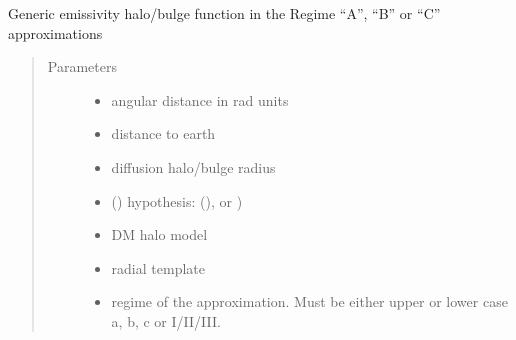 \documentclass[letterpaper,10pt,english]{sphinxmanual}
\begin{document}
\begin{fulllineitems}
\label{\detokenize{diffsph.profiles:diffsph.profiles.hfactors.H_brightness}}
\sphinxAtStartPar
Generic emissivity halo/bulge function in the Regime “A”, “B” or “C” approximations
\begin{quote}\begin{description}
\item[{Parameters}] \leavevmode\begin{itemize}
\item {} 
\sphinxAtStartPar
{} \textendash{} angular distance in rad units

\item {} 
\sphinxAtStartPar
{} \textendash{} distance to earth

\item {} 
\sphinxAtStartPar
{} \textendash{} diffusion halo/bulge radius

\item {} 
\sphinxAtStartPar
{} () \textendash{} hypothesis:  (),  or )

\item {} 
\sphinxAtStartPar
{} \textendash{} DM halo model

\item {} 
\sphinxAtStartPar
{} \textendash{} radial template

\item {} 
\sphinxAtStartPar
{} \textendash{} regime of the approximation. Must be either upper or lower case a, b, c or I/II/III.

\end{itemize}


\end{description}
\end{quote}
\end{fulllineitems}
\end{document}
